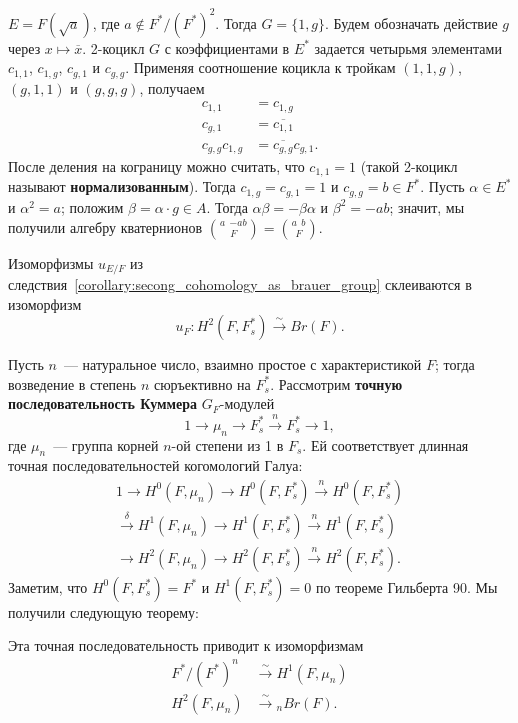 \documentclass[a4paper,oneside,12pt]{article}
\theoremstyle{plain} { \swapnumbers
\newtheorem{theorem}{Теорема}[subsection]
\newtheorem{corollary}[theorem]{Следствие}
\newtheorem{lemma}[theorem]{Лемма}
\newtheorem{proposition}[theorem]{Утверждение}
\newtheorem{claim}[theorem]{Факт}
}
\theoremstyle{definition} { \swapnumbers
\newtheorem{definition}[theorem]{Определение}
\newtheorem{notation}[theorem]{Обозначение}
\newtheorem{remark}[theorem]{Замечание}
\newtheorem{remarks}[theorem]{Замечания}
\newtheorem{example}[theorem]{Пример}
\newtheorem{examples}[theorem]{Примеры}
\newtheorem{sssection}[theorem]{}
}
\def\quaternion#1#2#3{\binom{{#1}\:\:{#2}}{#3}}
\begin{document}
\begin{example}\label{example:second_cohomology_of_quadratic_extension}
$E=F(\sqrt{a})$, где $a\notin F^*/(F^*)^2$. Тогда $G=\{1,g\}$. Будем обозначать
действие $g$ через $x\mapsto\overline{x}$. 2-коцикл $G$ с коэффициентами в $E^*$
задается четырьмя элементами $c_{1,1}$, $c_{1,g}$, $c_{g,1}$ и $c_{g,g}$.
Применяя соотношение коцикла к тройкам $(1,1,g)$, $(g,1,1)$ и $(g,g,g)$, получаем
$$
\begin{aligned}
c_{1,1}&=c_{1,g}\\
c_{g,1}&=\overline{c_{1,1}}\\
c_{g,g}c_{1,g}&=\overline{c_{g,g}}c_{g,1}.
\end{aligned}
$$
После деления на кограницу можно считать, что $c_{1,1}=1$ (такой 2-коцикл называют
{\bf нормализованным}). Тогда $c_{1,g}=c_{g,1}=1$ и $c_{g,g}=b\in F^*$.
Пусть $\alpha\in E^*$ и $\alpha^2=a$; положим $\beta=\alpha\cdot g\in A$.
Тогда $\alpha\beta=-\beta\alpha$ и $\beta^2=-ab$; значит, мы получили алгебру
кватернионов $\quaternion{a}{-ab}{F}=\quaternion{a}{b}{F}$.
\end{example}
\begin{theorem}
Изоморфизмы $u_{E/F}$ из следствия~\ref{corollary:secong_cohomology_as_brauer_group}
склеиваются в изоморфизм
$$
u_F\colon H^2(F,F^*_s)\stackrel{\sim}{\to}Br(F).
$$
\end{theorem}

Пусть $n$~--- натуральное число, взаимно простое с характеристикой $F$; тогда возведение в степень $n$
сюръективно на $F_s^*$. Рассмотрим {\bf точную последовательность Куммера} $G_F$-модулей
$$
1\to\mu_n\to F_s^*\stackrel{n}{\longrightarrow}F_s^*\to 1,
$$
где $\mu_n$~--- группа корней $n$-ой степени из 1 в $F_s$. Ей соответствует длинная
точная последовательностей когомологий Галуа:
\begin{multline*}
1\to H^0(F,\mu_n)\to H^0(F,F_s^*)\stackrel{n}{\to}H^0(F,F_s^*)\\
\stackrel{\delta}{\to}H^1(F,\mu_n)\to H^1(F,F_s^*)\stackrel{n}{\to}H^1(F,F_s^*)\\
\to H^2(F,\mu_n)\to H^2(F,F_s^*)\stackrel{n}{\to}H^2(F,F_s^*).
\end{multline*}
Заметим, что $H^0(F,F_s^*)=F^*$ и $H^1(F,F_s^*)=0$ по теореме Гильберта 90.
Мы получили следующую теорему:
\begin{theorem}\label{thm:Kummer}
Эта точная последовательность приводит к изоморфизмам
$$
\begin{aligned}
F^*/(F^*)^n&\stackrel{\sim}{\to}H^1(F,\mu_n)\\
H^2(F,\mu_n)&\stackrel{\sim}{\to}{}_nBr(F).
\end{aligned}
$$
\end{theorem}
\end{document}
